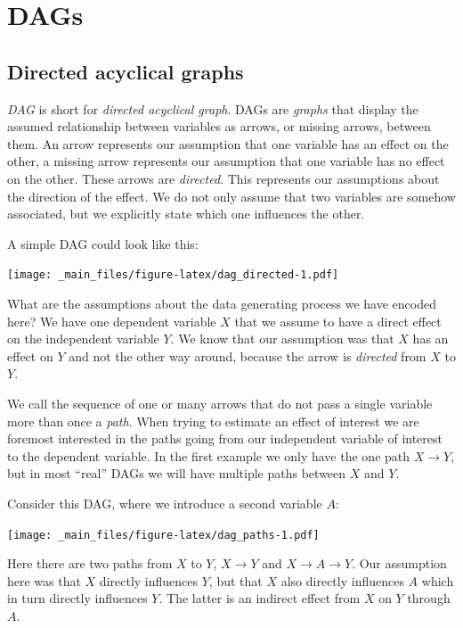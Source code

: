 \documentclass[
]{book}
\begin{document}
\hypertarget{dags}{%
\section{DAGs}\label{dags}}

\hypertarget{directed-acyclical-graphs}{%
\subsection{Directed acyclical graphs}\label{directed-acyclical-graphs}}

\emph{DAG} is short for \emph{directed acyclical graph}. DAGs are \emph{graphs} that display
the assumed relationship between variables as arrows, or missing arrows, between
them. An arrow represents our assumption that one variable has an effect on the
other, a missing arrow represents our assumption that one variable has no effect
on the other. These arrows are \emph{directed}. This represents our assumptions about
the direction of the effect. We do not only assume that two variables are
somehow associated, but we explicitly state which one influences the other.

A simple DAG could look like this:

\texttt{[image: \_main\_files/figure-latex/dag\_directed-1.pdf]}

What are the assumptions about the data generating process we have encoded here?
We have one dependent variable \(X\) that we assume to have a direct effect on the
independent variable \(Y\). We know that our assumption was that \(X\) has an effect
on \(Y\) and not the other way around, because the arrow is \emph{directed} from \(X\) to
\(Y\).

We call the sequence of one or many arrows that do not pass a single variable
more than once a \emph{path}. When trying to estimate an effect of interest we are
foremost interested in the paths going from our independent variable of interest
to the dependent variable.
In the first example we only have the one path \(X \rightarrow Y\), but in most
``real'' DAGs we will have multiple paths between \(X\) and \(Y\).

Consider this DAG, where we introduce a second variable \(A\):

\texttt{[image: \_main\_files/figure-latex/dag\_paths-1.pdf]}

Here there are two paths from \(X\) to \(Y\), \(X \rightarrow Y\) and
\(X \rightarrow A \rightarrow Y\). Our assumption here was that \(X\) directly
influences \(Y\), but that \(X\) also directly influences \(A\) which in turn directly
influences \(Y\). The latter is an indirect effect from \(X\) on \(Y\) through \(A\).
\end{document}
